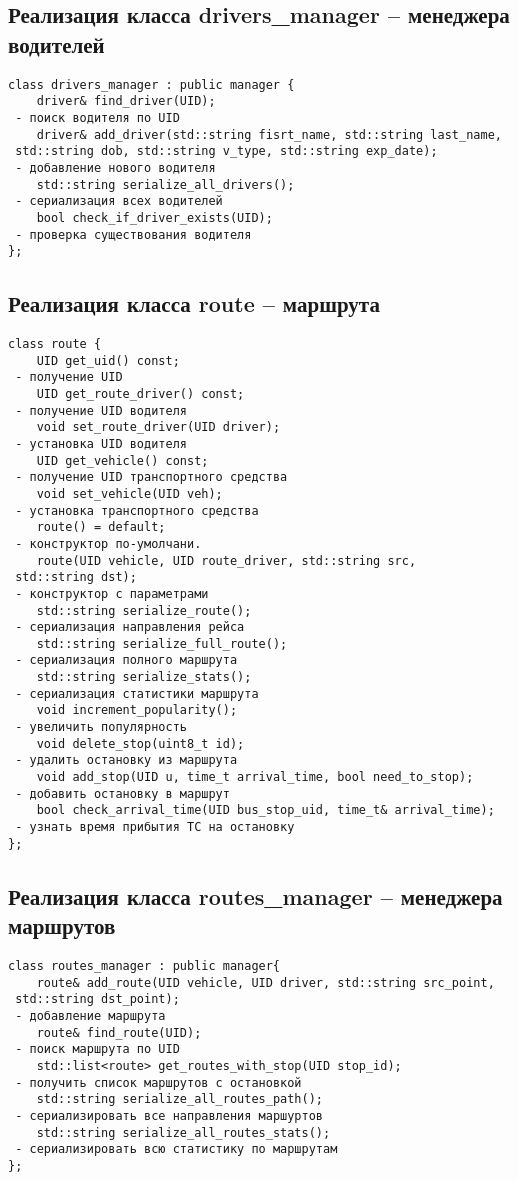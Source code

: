 \subsection{Реализация класса drivers\_manager -- менеджера водителей}
\begin{verbatim}
class drivers_manager : public manager {
	driver& find_driver(UID);
 - поиск водителя по UID
	driver& add_driver(std::string fisrt_name, std::string last_name, 
 std::string dob, std::string v_type, std::string exp_date);
 - добавление нового водителя
	std::string serialize_all_drivers();
 - сериализация всех водителей
	bool check_if_driver_exists(UID);
 - проверка существования водителя
};
\end{verbatim}

\subsection{Реализация класса route -- маршрута}
\begin{verbatim}
class route {
	UID get_uid() const;
 - получение UID
	UID get_route_driver() const;
 - получение UID водителя
	void set_route_driver(UID driver);
 - установка UID водителя
	UID get_vehicle() const;
 - получение UID транспортного средства
	void set_vehicle(UID veh);
 - установка транспортного средства
	route() = default;
 - конструктор по-умолчани.
	route(UID vehicle, UID route_driver, std::string src, 
 std::string dst);
 - конструктор с параметрами
	std::string serialize_route();
 - сериализация направления рейса
	std::string serialize_full_route();
 - сериализация полного маршрута
	std::string serialize_stats();
 - сериализация статистики маршрута
	void increment_popularity();
 - увеличить популярность
	void delete_stop(uint8_t id);
 - удалить остановку из маршрута
	void add_stop(UID u, time_t arrival_time, bool need_to_stop);
 - добавить остановку в маршрут
	bool check_arrival_time(UID bus_stop_uid, time_t& arrival_time);
 - узнать время прибытия ТС на остановку
};
\end{verbatim}

\subsection{Реализация класса routes\_manager -- менеджера маршрутов}
\begin{verbatim}
class routes_manager : public manager{
	route& add_route(UID vehicle, UID driver, std::string src_point,
 std::string dst_point);
 - добавление маршрута
	route& find_route(UID);
 - поиск маршрута по UID
	std::list<route> get_routes_with_stop(UID stop_id);
 - получить список маршрутов с остановкой
	std::string serialize_all_routes_path();
 - сериализировать все направления маршуртов
	std::string serialize_all_routes_stats();
 - сериализировать всю статистику по маршрутам
};
\end{verbatim}

